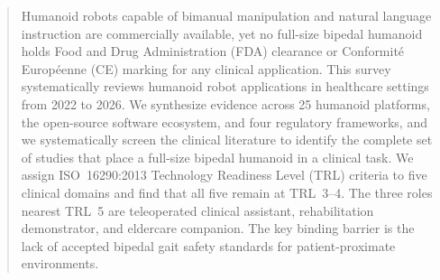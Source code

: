 ﻿\begin{abstract}
Humanoid robots capable of bimanual manipulation and natural language 
instruction are commercially available, yet no full-size bipedal humanoid 
holds Food and Drug Administration (FDA) clearance or Conformité 
Européenne (CE) marking for any clinical application. This survey 
systematically reviews humanoid robot applications in healthcare settings 
from 2022 to 2026. We synthesize evidence across 25 humanoid platforms, the
open-source software ecosystem, and four regulatory frameworks, and we
systematically screen the clinical literature to identify the complete set of
studies that place a full-size bipedal humanoid in a clinical task. We assign
ISO~16290:2013 Technology Readiness Level (TRL) criteria to five clinical
domains and find that all five remain at TRL~3--4. The three roles nearest TRL~5 
are teleoperated clinical assistant, rehabilitation demonstrator, and 
eldercare companion. The key binding barrier is the lack of accepted bipedal 
gait safety standards for patient-proximate environments.
\end{abstract}
